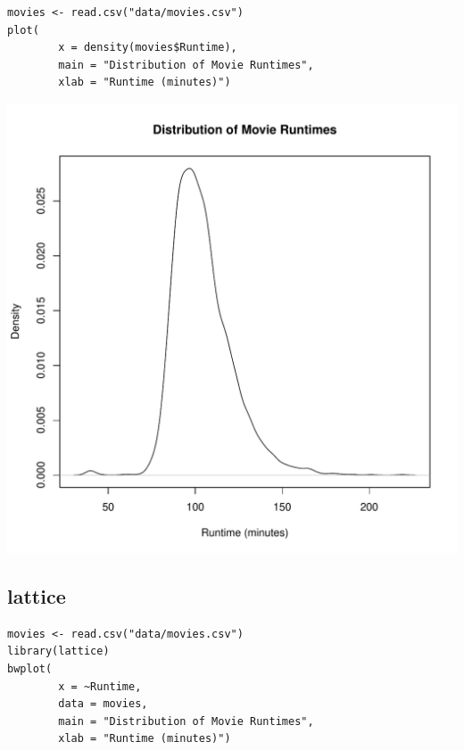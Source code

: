 \documentclass[a4paper, captions=tableheading]{tufte-book}
\begin{document}
\begin{verbatim}
movies <- read.csv("data/movies.csv")
plot(
		x = density(movies$Runtime),
		main = "Distribution of Movie Runtimes",
		xlab = "Runtime (minutes)")
\end{verbatim}

\includegraphics[width=.9\linewidth]{img/1-num-base-04.pdf}

\subsection{lattice}
\label{sec:orgheadline8}

\begin{verbatim}
movies <- read.csv("data/movies.csv")
library(lattice)
bwplot(
		x = ~Runtime,
		data = movies,
		main = "Distribution of Movie Runtimes",
		xlab = "Runtime (minutes)")
\end{verbatim}
\end{document}
